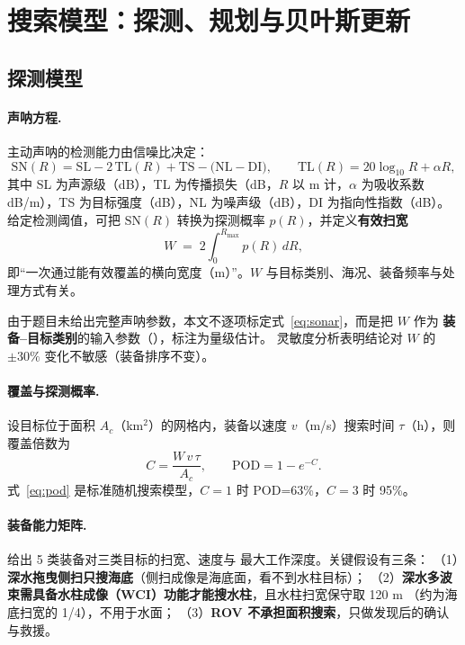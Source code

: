 \section{搜索模型：探测、规划与贝叶斯更新}\label{sec:search}

\subsection{探测模型}

\paragraph{声呐方程.} 主动声呐的检测能力由信噪比决定：
\begin{equation}
  \mathrm{SN}(R) = \mathrm{SL} - 2\,\mathrm{TL}(R) + \mathrm{TS}
  - \bigl(\mathrm{NL}-\mathrm{DI}\bigr),
  \qquad \mathrm{TL}(R)=20\log_{10}R+\alpha R,
  \label{eq:sonar}
\end{equation}
其中 SL 为声源级（dB），TL 为传播损失（dB，$R$ 以 m 计，$\alpha$ 为吸收系数
dB/m），TS 为目标强度（dB），NL 为噪声级（dB），DI 为指向性指数（dB）。
给定检测阈值，可把 $\mathrm{SN}(R)$ 转换为探测概率 $p(R)$，并定义\textbf{有效扫宽}
\begin{equation}
  W \;=\; 2\int_0^{R_{\max}} p(R)\,dR ,
  \label{eq:W}
\end{equation}
即“一次通过能有效覆盖的横向宽度（m）”。$W$ 与目标类别、海况、装备频率与处理方式有关。

由于题目未给出完整声呐参数，本文不逐项标定式~\eqref{eq:sonar}，而是把 $W$ 作为
\textbf{装备–目标类别}的输入参数（），标注为量级估计。
灵敏度分析表明结论对 $W$ 的 $\pm30\%$ 变化不敏感（装备排序不变）。

\paragraph{覆盖与探测概率.} 设目标位于面积 $A_c$（km$^2$）的网格内，装备以速度
$v$（m/s）搜索时间 $\tau$（h），则覆盖倍数为
\begin{equation}
  C = \frac{W\, v\, \tau}{A_c},\qquad \mathrm{POD} = 1-e^{-C}.
  \label{eq:pod}
\end{equation}
式~\eqref{eq:pod} 是标准随机搜索模型，$C=1$ 时 POD=63\%，$C=3$ 时 95\%。

\paragraph{装备能力矩阵.}  给出 5 类装备对三类目标的扫宽、速度与
最大工作深度。关键假设有三条：
（1）\textbf{深水拖曳侧扫只搜海底}（侧扫成像是海底面，看不到水柱目标）；
（2）\textbf{深水多波束需具备水柱成像（WCI）功能才能搜水柱}，且水柱扫宽保守取 120 m
（约为海底扫宽的 1/4），不用于水面；
（3）\textbf{ROV 不承担面积搜索}，只做发现后的确认与救援。


